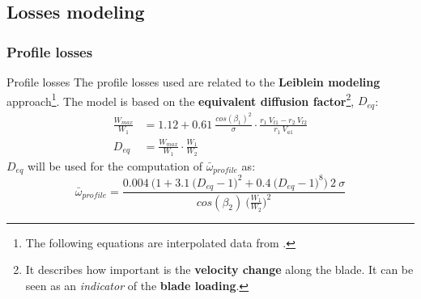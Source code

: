 \subsection{Losses modeling}
\subsubsection{Profile losses}
	{\nologo
	\begin{frame}{Profile losses}
		The profile losses used are related to the \textbf{Leiblein modeling} approach\footnote{The following equations are interpolated data from \cite[Sec. 6.4]{axial2004}.}.
		\newline
		The model is based on the \textbf{equivalent diffusion factor}\footnote{It describes how important is the \textbf{velocity change} along the blade. It can be seen as an \textit{indicator} of the \textbf{blade loading}.}, $D_{eq}$:
		\begin{align}
			\frac{W_{max}}{W_1} & = 1.12 + 0.61 \ \frac{cos(\beta_1)^2}{\sigma} \cdot \frac{r_1 \ V_{t1} - r_2 \ V_{t2}}{r_1 \ V_{a1}} \nonumber \\
			D_{eq} & = \frac{W_{max}}{W_1} \cdot \frac{W_1}{W_2} \nonumber  
		\end{align}
		$D_{eq}$ will be used for the computation of $\bar{\omega}_{profile}$ as:
		\begin{equation}
			\bar{\omega}_{profile} = \frac{0.004 \ \Big( 1 + 3.1 \ \big( D_{eq} - 1 \big)^2 + 0.4 \ \big( D_{eq} - 1 \big)^8 \Big) \ 2 \ \sigma}{cos(\beta_2) \ \Big( \frac{W_1}{W_2} \Big)^2} \nonumber
		\end{equation}
	\end{frame}
	}

